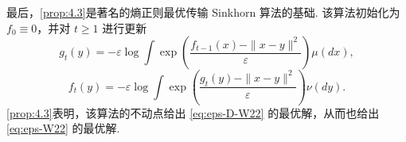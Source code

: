 最后，\autoref{prop:4.3}是著名的熵正则最优传输 Sinkhorn 算法的基础. 该算法初始化为 $f_0\equiv0$，并对 $t\ge1$ 进行更新
\begin{equation}\label{eq:4.11}
g_t(y)=-\varepsilon\log\int\exp\left(\frac{f_{t-1}(x)-\|x-y\|^2}{\varepsilon}\right)\mu(dx),
\end{equation}
\begin{equation}\label{eq:4.12}
f_t(y)=-\varepsilon\log\int\exp\left(\frac{g_t(y)-\|x-y\|^2}{\varepsilon}\right)\nu(dy).
\end{equation}
\autoref{prop:4.3}表明，该算法的不动点给出 \eqref{eq:eps-D-W22} 的最优解，从而也给出 \eqref{eq:eps-W22} 的最优解.
